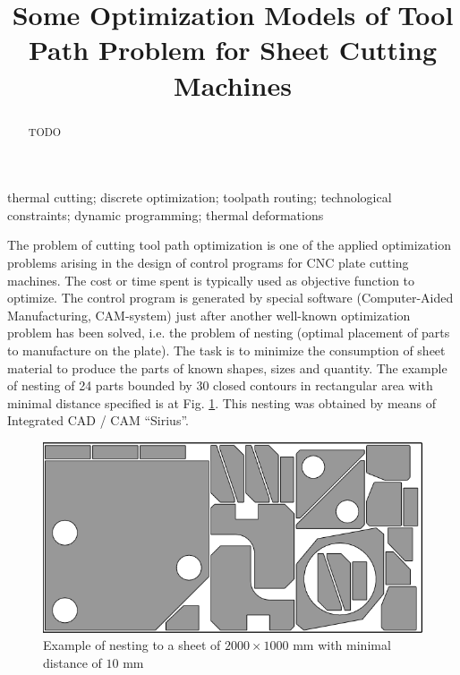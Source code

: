 \documentclass{../download/tPRS2e}
\begin{document}
\title{Some Optimization Models of Tool Path Problem for Sheet Cutting Machines}

\author{
}

\maketitle

\begin{abstract}
TODO
\end{abstract}

\begin{keywords}
    thermal cutting;
    discrete optimization;
    toolpath routing;
    technological constraints;
    dynamic programming;
    thermal deformations
\end{keywords}

The problem of cutting tool path optimization
is one of the applied optimization problems arising
in the design of control programs for CNC plate cutting machines.
The cost or time spent is typically used
as objective function to optimize.
The control program is generated by special software 
(Computer-Aided Manufacturing, CAM-system)
just after another well-known optimization problem
has been solved,
i.e. the problem of nesting
(optimal placement of parts to manufacture on the plate).
The task is to minimize the consumption of sheet material
to produce the parts of known shapes, sizes and quantity.
The example of nesting of 24 parts bounded by 30 closed contours
in rectangular area with minimal distance specified is at Fig. \ref{nezting}.
This nesting was obtained by means of Integrated CAD / CAM ``Sirius''.

\begin{figure}[h]
    \begin{center}
    \includegraphics{nesting.png}
    \caption{Example of nesting to a sheet of $2000 \times 1000$ mm
    with minimal distance of $10$ mm}
    \label{nezting}
    \end{center}
\end{figure}
\end{document}
